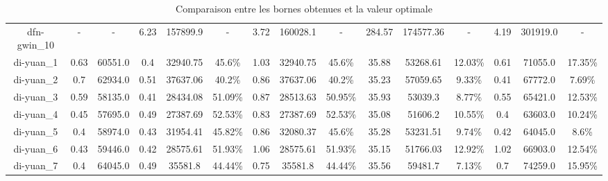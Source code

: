\documentclass[main.tex]{subfiles}
\begin{document}
\begin{landscape}
\begin{table}[h]
\begin{tabular}{c|cc|ccc|ccc|ccc|ccc}
	dfn-gwin\_10 &- &- &6.23 &157899.9 &- &3.72 &160028.1 &- &284.57 &174577.36 &- &4.19 &301919.0 &-\\
	di-yuan\_1 &0.63 &60551.0 &0.4 &32940.75 &45.6\% &1.03 &32940.75 &45.6\% &35.88 &53268.61 &12.03\% &0.61 &71055.0 &17.35\%\\
	di-yuan\_2 &0.7 &62934.0 &0.51 &37637.06 &40.2\% &0.86 &37637.06 &40.2\% &35.23 &57059.65 &9.33\% &0.41 &67772.0 &7.69\%\\
	di-yuan\_3 &0.59 &58135.0 &0.41 &28434.08 &51.09\% &0.87 &28513.63 &50.95\% &35.93 &53039.3 &8.77\% &0.55 &65421.0 &12.53\%\\
	di-yuan\_4 &0.45 &57695.0 &0.49 &27387.69 &52.53\% &0.83 &27387.69 &52.53\% &35.08 &51606.2 &10.55\% &0.4 &63603.0 &10.24\%\\
	di-yuan\_5 &0.4 &58974.0 &0.43 &31954.41 &45.82\% &0.86 &32080.37 &45.6\% &35.28 &53231.51 &9.74\% &0.42 &64045.0 &8.6\%\\
	di-yuan\_6 &0.43 &59446.0 &0.42 &28575.61 &51.93\% &1.06 &28575.61 &51.93\% &35.15 &51766.03 &12.92\% &1.02 &66903.0 &12.54\%\\
	di-yuan\_7 &0.4 &64045.0 &0.49 &35581.8 &44.44\% &0.75 &35581.8 &44.44\% &35.56 &59481.7 &7.13\% &0.7 &74259.0 &15.95\%\\
\end{tabular}\caption{Comparaison entre les bornes obtenues et la valeur optimale}
\end{table}
\end{landscape}
\newpage
\thispagestyle{empty}
\end{document}
